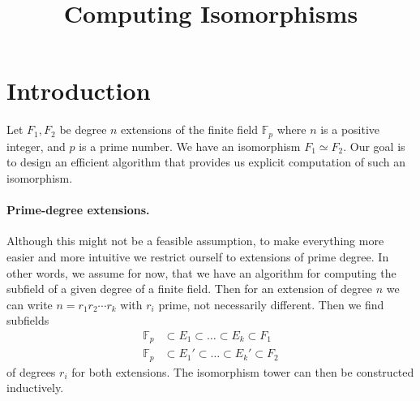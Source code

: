 \documentclass[12pt]{article}
\title{Computing Isomorphisms}
\date{}
\theoremstyle{plain}
\theoremstyle{definition}
\def\F{\mathbb{F}}
\newcounter{algorithm}
\begin{document}
\maketitle

\section{Introduction}

Let $F_1, F_2$ be degree $n$ extensions of the finite field $\F_p$ where $n$ is a positive integer, and $p$ is a prime number. We have an isomorphism $F_1 \simeq F_2$. Our goal is to design an efficient algorithm that provides us explicit computation of such an isomorphism.

\paragraph{Prime-degree extensions.} Although this might not be a feasible assumption, to make everything more easier and more intuitive we 
restrict ourself to extensions of prime degree. In other words, we assume for now, that we have an algorithm for computing the subfield of a given degree of a finite field. Then for an extension of degree $n$ we can write $n = r_1r_2\cdots r_k$ with $r_i$ prime, not necessarily different. Then we find subfields 
\begin{align*}
	\F_p & \subset E_1 \subset \ldots \subset E_k \subset F_1 \\
	\F_p & \subset E_1' \subset \ldots \subset E_k' \subset F_2
\end{align*}
of degrees $r_i$ for both extensions. The isomorphism tower can then be constructed inductively. 
\end{document}
